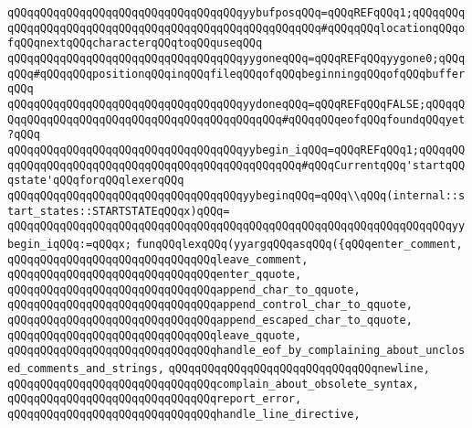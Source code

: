 \verb|qQQqqQQqqQQqqQQqqQQqqQQqqQQqqQQqqQQqyybufposqQQq=qQQqREFqQQq1;qQQqqQQqqQQqqQQqqQQqqQQqqQQqqQQqqQQqqQQqqQQqqQQqqQQqqQQq#qQQqqQQqlocationqQQqofqQQqnextqQQqcharacterqQQqtoqQQquseqQQq|\newline
\verb|qQQqqQQqqQQqqQQqqQQqqQQqqQQqqQQqqQQqyygoneqQQq=qQQqREFqQQqyygone0;qQQqqQQq#qQQqqQQqpositionqQQqinqQQqfileqQQqofqQQqbeginningqQQqofqQQqbufferqQQq|\newline
\verb|qQQqqQQqqQQqqQQqqQQqqQQqqQQqqQQqqQQqyydoneqQQq=qQQqREFqQQqFALSE;qQQqqQQqqQQqqQQqqQQqqQQqqQQqqQQqqQQqqQQqqQQqqQQq#qQQqqQQqeofqQQqfoundqQQqyet?qQQq|\newline
\verb|qQQqqQQqqQQqqQQqqQQqqQQqqQQqqQQqqQQqyybegin_iqQQq=qQQqREFqQQq1;qQQqqQQqqQQqqQQqqQQqqQQqqQQqqQQqqQQqqQQqqQQqqQQqqQQq#qQQqCurrentqQQq'startqQQqstate'qQQqforqQQqlexerqQQq|\newline
\newline
\verb|qQQqqQQqqQQqqQQqqQQqqQQqqQQqqQQqqQQqyybeginqQQq=qQQq\\qQQq(internal::start_states::STARTSTATEqQQqx)qQQq=|\newline
\verb|qQQqqQQqqQQqqQQqqQQqqQQqqQQqqQQqqQQqqQQqqQQqqQQqqQQqqQQqqQQqqQQqqQQqyybegin_iqQQq:=qQQqx;|\newline
\newline
\verb|funqQQqlexqQQq(yyargqQQqasqQQq({qQQqenter_comment,|\newline
\verb|qQQqqQQqqQQqqQQqqQQqqQQqqQQqqQQqleave_comment,|\newline
\verb|qQQqqQQqqQQqqQQqqQQqqQQqqQQqqQQqenter_qquote,|\newline
\verb|qQQqqQQqqQQqqQQqqQQqqQQqqQQqqQQqappend_char_to_qquote,|\newline
\verb|qQQqqQQqqQQqqQQqqQQqqQQqqQQqqQQqappend_control_char_to_qquote,|\newline
\verb|qQQqqQQqqQQqqQQqqQQqqQQqqQQqqQQqappend_escaped_char_to_qquote,|\newline
\verb|qQQqqQQqqQQqqQQqqQQqqQQqqQQqqQQqleave_qquote,|\newline
\verb|qQQqqQQqqQQqqQQqqQQqqQQqqQQqqQQqhandle_eof_by_complaining_about_unclosed_comments_and_strings,|\newline
\verb|qQQqqQQqqQQqqQQqqQQqqQQqqQQqqQQqnewline,|\newline
\verb|qQQqqQQqqQQqqQQqqQQqqQQqqQQqqQQqcomplain_about_obsolete_syntax,|\newline
\verb|qQQqqQQqqQQqqQQqqQQqqQQqqQQqqQQqreport_error,|\newline
\verb|qQQqqQQqqQQqqQQqqQQqqQQqqQQqqQQqhandle_line_directive,|\newline
